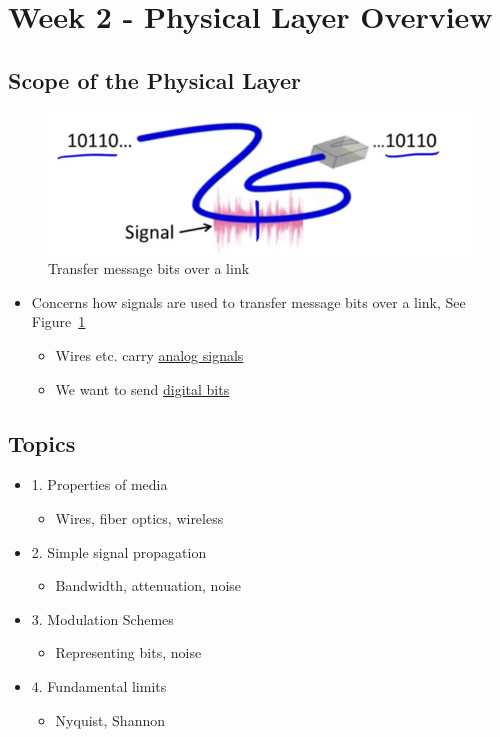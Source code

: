 \documentclass[12pt]{ctexart}   %
\begin{document}
	
\section{Week 2 - Physical Layer Overview}
	\subsection{Scope of the Physical Layer}
	
	\begin{figure}[h!] %
	 \centering
	 \includegraphics[scale=0.7]{images/2-1-1}
	\caption{ Transfer message bits over a link}
	 \label{fig:2-1-1}
	 \end{figure}
	 
	\begin{itemize}
		\item Concerns how signals are used to transfer message bits over a link, See Figure~\ref{fig:2-1-1}
		\begin{itemize}
			\item Wires etc. carry \underline{analog signals}
			\item We want to send \underline{digital bits}
		\end{itemize}
	\end{itemize}
	
	\subsection{Topics}
	\begin{itemize}
		\item {\color{blue} 1.} Properties of media
		\begin{itemize}
			\item Wires, fiber optics, wireless
		\end{itemize}
		
		\item {\color{blue} 2.} Simple signal propagation
		\begin{itemize}
			\item	Bandwidth, attenuation, noise
		\end{itemize}
		
		\item {\color{blue} 3.} Modulation Schemes
		\begin{itemize}
			\item Representing bits, noise
		\end{itemize}
		
		\item {\color{blue} 4.} Fundamental limits
		\begin{itemize}
			\item Nyquist, Shannon
		\end{itemize}
	\end{itemize}
	
\end{document}
